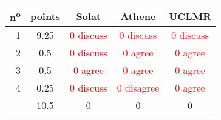 \begin{center}
 \begin{tabular}{ r | c || c c c }
  n\textsuperscript{o} & points & Solat                      & Athene                      & UCLMR                      \\ \hline
  1                    & 9.25   & \textcolor{red}{0 discuss} & \textcolor{red}{0 discuss}  & \textcolor{red}{0 discuss} \\
  2                    & 0.5    & \textcolor{red}{0 discuss} & \textcolor{red}{0 agree}    & \textcolor{red}{0 agree}   \\
  3                    & 0.5    & \textcolor{red}{0 agree}   & \textcolor{red}{0 agree}    & \textcolor{red}{0 agree}   \\
  4                    & 0.25   & \textcolor{red}{0 discuss} & \textcolor{red}{0 disagree} & \textcolor{red}{0 agree}   \\ \hline
                       & 10.5   & 0                          & 0                           & 0                          \\
 \end{tabular}
\end{center}
